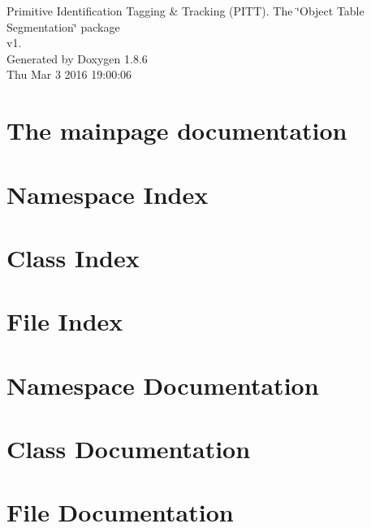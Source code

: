 \documentclass[twoside]{book}
\newcommand{\clearemptydoublepage}{%
  \newpage{\pagestyle{empty}\cleardoublepage}%
}
\begin{document}
\hypersetup{pageanchor=false}
\begin{titlepage}
\vspace*{7cm}
\begin{center}%
{\Large Primitive Identification Tagging \& Tracking (P\-I\-T\-T). The \char`\"{}\-Object Table Segmentation\char`\"{} package \\[1ex]\large v1. }\\
\vspace*{1cm}
{\large Generated by Doxygen 1.8.6}\\
\vspace*{0.5cm}
{\small Thu Mar 3 2016 19:00:06}\\
\end{center}
\end{titlepage}
\clearemptydoublepage
\tableofcontents
\clearemptydoublepage
{}
\hypersetup{pageanchor=true}

\chapter{The mainpage documentation}
\label{index}\hypertarget{index}{}
\chapter{Namespace Index}

\chapter{Class Index}

\chapter{File Index}

\chapter{Namespace Documentation}


\chapter{Class Documentation}



\chapter{File Documentation}
















\newpage
{}
{}
\printindex
\end{document}
